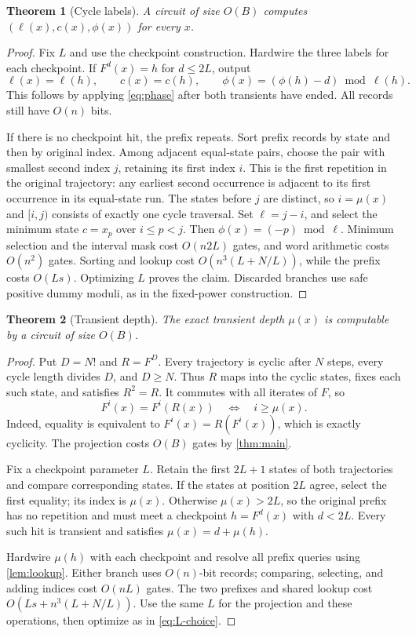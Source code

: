 \documentclass[11pt]{article}
\newtheorem{theorem}{Theorem}[section]
\theoremstyle{definition}
\theoremstyle{remark}
\numberwithin{equation}{section}
\begin{document}
\begin{theorem}[Cycle labels]\label{thm:labels}
A circuit of size $O(B)$ computes $(\ell(x),c(x),\phi(x))$ for every $x$.
\end{theorem}
\begin{proof}
Fix $L$ and use the checkpoint construction.  Hardwire the
three labels for each checkpoint.  If $F^d(x)=h$ for $d\leq 2L$, output
\[
 \ell(x)=\ell(h),\qquad c(x)=c(h),\qquad
 \phi(x)=(\phi(h)-d)\bmod\ell(h).
\]
This follows by applying \cref{eq:phase} after both transients have ended.
All records still have $O(n)$ bits.

If there is no checkpoint hit, the prefix repeats.  Sort prefix records
by state and then by original index.  Among adjacent equal-state pairs,
choose the pair with smallest second index $j$, retaining its first
index $i$.  This is the first repetition in the original trajectory:
any earliest second occurrence is adjacent to its first occurrence in
its equal-state run.  The states before $j$ are distinct, so
$i=\mu(x)$ and $[i,j)$ consists of exactly one cycle traversal.
Set $\ell=j-i$, and select the minimum state $c=x_p$ over $i\leq p<j$.
Then $\phi(x)=(-p)\bmod\ell$.  Minimum selection and the interval mask
cost $O(n2L)$ gates, and word arithmetic costs $O(n^2)$ gates.
Sorting and lookup cost $O(n^3(L+N/L))$, while the prefix costs $O(Ls)$.
Optimizing $L$ proves the claim.  Discarded branches use safe positive
dummy moduli, as in the fixed-power construction.
\end{proof}

\begin{theorem}[Transient depth]\label{thm:depth}
The exact transient depth $\mu(x)$ is computable by a circuit of size $O(B)$.
\end{theorem}
\begin{proof}
Put $D=N!$ and $R=F^D$.  Every trajectory is cyclic after $N$ steps,
every cycle length divides $D$, and $D\geq N$.  Thus $R$ maps into the
cyclic states, fixes each such state, and satisfies $R^2=R$.  It commutes
with all iterates of $F$, so
\begin{equation}\label{eq:projection-depth}
 F^i(x)=F^i(R(x))\quad\Longleftrightarrow\quad i\geq\mu(x).
\end{equation}
Indeed, equality is equivalent to $F^i(x)=R(F^i(x))$, which is exactly
cyclicity.  The projection costs $O(B)$ gates by \cref{thm:main}.

Fix a checkpoint parameter $L$.  Retain the first $2L+1$
states of both trajectories and compare corresponding states.  If the
states at position $2L$ agree, select the first equality; its index is
$\mu(x)$.  Otherwise $\mu(x)>2L$, so the original prefix has no repetition
and must meet a checkpoint $h=F^d(x)$ with $d<2L$.  Every such hit is
transient and satisfies $\mu(x)=d+\mu(h)$.

Hardwire $\mu(h)$ with each checkpoint and resolve all prefix queries
using \cref{lem:lookup}.  Either branch uses $O(n)$-bit records; comparing,
selecting, and adding indices cost $O(nL)$ gates.  The two prefixes and
shared lookup cost $O(Ls+n^3(L+N/L))$.  Use the same $L$ for the projection
and these operations, then optimize as in \cref{eq:L-choice}.
\end{proof}
\end{document}
